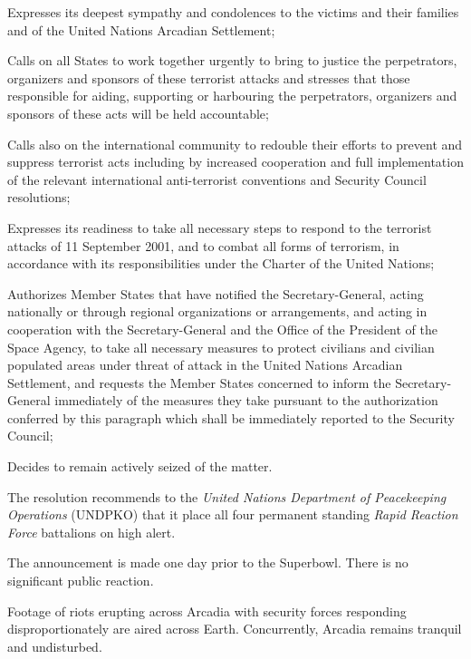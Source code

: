 \item Expresses its deepest sympathy and condolences to the victims and their families and of the United Nations Arcadian Settlement;

\item Calls on all States to work together urgently to bring to justice the perpetrators, organizers and sponsors of these terrorist attacks and stresses that those responsible for aiding, supporting or harbouring the perpetrators, organizers and sponsors of these acts will be held accountable;

\item Calls also on the international community to redouble their efforts to prevent and suppress terrorist acts including by increased cooperation and full implementation of the relevant international anti-terrorist conventions and Security Council resolutions;

\item Expresses its readiness to take all necessary steps to respond to the terrorist attacks of 11 September 2001, and to combat all forms of terrorism, in accordance with its responsibilities under the Charter of the United Nations;

\item Authorizes Member States that have notified the Secretary-General, acting nationally or through regional organizations or arrangements, and acting in cooperation with the Secretary-General and the Office of the President of the Space Agency, to take all necessary measures to protect civilians and civilian populated areas under threat of attack in the United Nations Arcadian Settlement, and requests the Member States concerned to inform the Secretary-General immediately of the measures they take pursuant to the authorization conferred by this paragraph which shall be immediately reported to the Security Council;

\item Decides to remain actively seized of the matter.
\stopitemize
\stopTimelineDocument

The resolution recommends to the {\it United Nations Department of Peacekeeping Operations} (UNDPKO) that it place all four permanent standing {\it Rapid Reaction Force} battalions on high alert.

The announcement is made one day prior to the Superbowl. There is no significant public reaction.
\StopTimelineDate

Footage of riots erupting across Arcadia with security forces responding disproportionately are aired across Earth. Concurrently, Arcadia remains tranquil and undisturbed.
\StopTimelineDate

